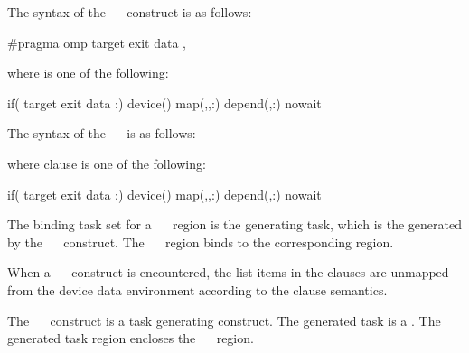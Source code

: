 \syntax
\begin{ccppspecific}
The syntax of the ~~ construct is as follows:
\begin{ompcPragma}
#pragma omp target exit data \plc{[ clause[ [},\plc{] clause]...] new-line}
\end{ompcPragma}
where  is one of the following:
\begin{indentedcodelist}
if(\plc{[} target exit data :\plc{] scalar-expression})
device()
map(\plc{[map-type-modifier[},\plc{] [map-type-modifier[},\plc{] ...] map-type}:)
depend(\plc{[depend-modifier},\plc{] dependence-type }:)
nowait
\end{indentedcodelist}
\end{ccppspecific}
\begin{fortranspecific}
The syntax of the ~~ is as follows:
where clause is one of the following:
\begin{indentedcodelist}
if(\plc{[} target exit data :\plc{] scalar-logical-expression})
device()
map(\plc{[map-type-modifier[},\plc{] [map-type-modifier[},\plc{] ...] map-type}:)
depend(\plc{[depend-modifier},\plc{] dependence-type }:)
nowait
\end{indentedcodelist}
\end{fortranspecific}

\binding
The binding task set for a ~~ region is
the generating task, which is the  generated by the
~~ construct. The
~~ region binds to the corresponding
 region.

\descr
When a ~~ construct is encountered, the list 
items in the  clauses are unmapped from the device data environment 
according to the  clause semantics.

The ~~ construct is a task generating construct.  
The generated task is a .  The generated task region encloses the 
~~ region.

